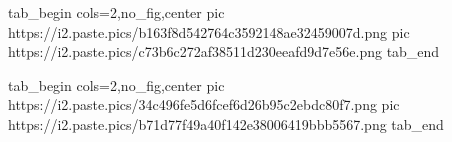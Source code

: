  
 
 
 
 
\zzSecCmtScr

\ifcmt
  tab_begin cols=2,no_fig,center
     pic https://i2.paste.pics/b163f8d542764c3592148ae32459007d.png
		 pic https://i2.paste.pics/c73b6c272af38511d230eeafd9d7e56e.png
  tab_end
\fi

\ifcmt
  tab_begin cols=2,no_fig,center
		pic https://i2.paste.pics/34c496fe5d6fcef6d26b95c2ebdc80f7.png
		pic https://i2.paste.pics/b71d77f49a40f142e38006419bbb5567.png
  tab_end
\fi
